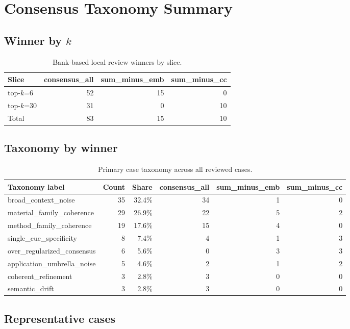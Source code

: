 \section{Consensus Taxonomy Summary}

\subsection{Winner by $k$}
\begin{table}[t]
\centering
\begin{tabular}{lrrr}
\hline
Slice & consensus\_all & sum\_minus\_emb & sum\_minus\_cc \\
\hline
top-$k$=6 & 52 & 15 & 0 \\
top-$k$=30 & 31 & 0 & 10 \\
Total & 83 & 15 & 10 \\
\hline
\end{tabular}
\caption{Bank-based local review winners by slice.}
\end{table}

\subsection{Taxonomy by winner}
\begin{table}[t]
\centering
\begin{tabular}{lrrrrr}
\hline
Taxonomy label & Count & Share & consensus\_all & sum\_minus\_emb & sum\_minus\_cc \\
\hline
broad\_context\_noise & 35 & 32.4\% & 34 & 1 & 0 \\
material\_family\_coherence & 29 & 26.9\% & 22 & 5 & 2 \\
method\_family\_coherence & 19 & 17.6\% & 15 & 4 & 0 \\
single\_cue\_specificity & 8 & 7.4\% & 4 & 1 & 3 \\
over\_regularized\_consensus & 6 & 5.6\% & 0 & 3 & 3 \\
application\_umbrella\_noise & 5 & 4.6\% & 2 & 1 & 2 \\
coherent\_refinement & 3 & 2.8\% & 3 & 0 & 0 \\
semantic\_drift & 3 & 2.8\% & 3 & 0 & 0 \\
\hline
\end{tabular}
\caption{Primary case taxonomy across all reviewed cases.}
\end{table}

\subsection{Representative cases}
